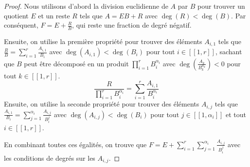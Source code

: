 \documentclass[12pt, a4paper]{report}
\begin{document}
\begin{proof}
    Nous utilisons d'abord la division euclidienne de $A$ par $B$ pour trouver un quotient $E$ et un reste $R$ tels que $A = EB + R$ avec $\deg(R) < \deg(B)$. Par conséquent, $F = E + \frac RB$, qui reste une fraction de degré négatif. 
    
    Ensuite, on utilise la première propriété pour trouver des éléments $A_{i,1}$ tels que $\frac RB = \sum_{i=1}^r \frac{A_{i,1}}{B_i}$ avec $\deg(A_{i,1}) < \deg(B_i)$ pour tout $i \in [\![1,r]\!]$, sachant que $B$ peut être décomposé en un produit $\prod_{i=1}^r B_i^{\alpha_i}$ avec $\deg(\frac{A_k}{B_k^{\alpha_k}}) < 0$ pour tout $k \in [\![1,r]\!]$.
    $$\frac{R}{\prod_{i=1}^r B_i^{\alpha_i}} = \sum_{i=1}^r \frac{A_{i,1}}{B_i^{\alpha_i}}$$
    Ensuite, on utilise la seconde propriété pour trouver des éléments $A_{i,j}$ tels que $\frac{A_{i,1}}{B_i} = \sum_{j=1}^{\alpha_i} \frac{A_{i,j}}{B_i^j}$ avec $\deg(A_{i,j}) < \deg(B_i)$ pour tout $j \in [\![1,\alpha_i]\!]$ et tout $i \in [\![1,r]\!]$.
    
    En combinant toutes ces égalités, on trouve que $F = E + \sum_{i=1}^r \sum_{j=1}^{\alpha_i} \frac{A_{i,j}}{B_i^j}$ avec les conditions de degrés sur les $A_{i,j}$.
\end{proof}
\end{document}
